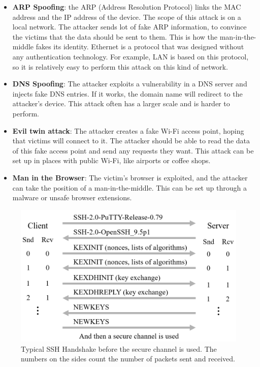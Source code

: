 \documentclass[journal=tches,final]{iacrtrans}
\begin{document}
\begin{itemize}

  \item \textbf{ARP Spoofing}: the ARP (Address Resolution Protocol) links the MAC address and the IP address of the device. The scope of this attack is on a local network. The attacker sends lot of fake ARP information, to convince the victims that the data should be sent to them. This is how the man-in-the-middle fakes its identity. \cite{MitM} Ethernet is a protocol that was designed without any authentication technology. For example, LAN is based on this protocol, so it is relatively easy to perform this attack on this kind of network. \cite{ARP_cache_poisoning}
  
  \item \textbf{DNS Spoofing}: The attacker exploits a vulnerability in a DNS server and injects fake DNS entries. If it works, the domain name will redirect to the attacker's device. This attack often has a larger scale and is harder to perform. \cite{MitM}
 
  \item \textbf{Evil twin attack}: The attacker creates a fake Wi-Fi access point, hoping that victims will connect to it. The attacker should be able to read the data of this fake access point and send any requests they want. This attack can be set up in places with public Wi-Fi, like airports or coffee shops. \cite{evil_twin_attack}
  
  \item \textbf{Man in the Browser}: The victim's browser is exploited, and the attacker can take the position of a man-in-the-middle. This can be set up through a malware or unsafe browser extensions. \cite{man_in_the_browser}
  
\end{itemize}


\begin{figure}
    \centering
    \includegraphics[width=0.6\linewidth]{diagrams-i-made/Basic-SSH-handshake.png}
    \caption{Typical SSH Handshake before the secure channel is used. The numbers on the sides count the number of packets sent and received.}
    \label{fig:basic-SSH-handshake}
\end{figure}
\end{document}
